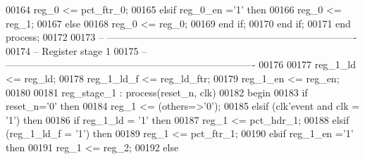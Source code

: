 \begin{DoxyCode}
00164                 reg\_0 <= pct\_ftr\_0;
00165          \textcolor{keywordflow}{elsif} \textcolor{vhdlchar}{reg_0_en} \textcolor{vhdlchar}{=}\textcolor{vhdlchar}{'}\textcolor{vhdllogic}{}\textcolor{vhdllogic}{1}\textcolor{vhdlchar}{'} \textcolor{keywordflow}{then} 
00166             reg\_0 <= reg\_1;
00167          \textcolor{keywordflow}{else} 
00168             reg\_0 <= reg\_0;
00169          \textcolor{keywordflow}{end} \textcolor{keywordflow}{if};
00170       \textcolor{keywordflow}{end} \textcolor{keywordflow}{if};
00171    \textcolor{keywordflow}{end} \textcolor{keywordflow}{process};
00172    
00173 \textcolor{keyword}{-- ----------------------------------------------------------------------------}
00174 \textcolor{keyword}{-- Register stage 1}
00175 \textcolor{keyword}{-- ----------------------------------------------------------------------------  }
00176    
00177 reg\_1\_ld <= reg\_ld;
00178 reg\_1\_ld\_f <= reg\_ld\_ftr;
00179 reg\_1\_en <= reg\_en;
00180    
00181  reg\_stage\_1 :  \textcolor{keywordflow}{process}(reset_n, clk)
00182 \textcolor{vhdlkeyword}{   begin}
00183       \textcolor{keywordflow}{if} \textcolor{vhdlchar}{reset_n}\textcolor{vhdlchar}{=}\textcolor{vhdlchar}{'}\textcolor{vhdllogic}{}\textcolor{vhdllogic}{0}\textcolor{vhdlchar}{'} \textcolor{keywordflow}{then}
00184          reg\_1 <= (others=>'0');
00185       \textcolor{keywordflow}{elsif} \textcolor{vhdlchar}{(}\textcolor{vhdlchar}{clk}\textcolor{vhdlchar}{'}\textcolor{vhdlkeyword}{event} \textcolor{keywordflow}{and} \textcolor{vhdlchar}{clk} \textcolor{vhdlchar}{=} \textcolor{vhdlchar}{'}\textcolor{vhdllogic}{}\textcolor{vhdllogic}{1}\textcolor{vhdlchar}{'}\textcolor{vhdlchar}{)} \textcolor{keywordflow}{then}
00186          \textcolor{keywordflow}{if} \textcolor{vhdlchar}{reg_1_ld} \textcolor{vhdlchar}{=} \textcolor{vhdlchar}{'}\textcolor{vhdllogic}{}\textcolor{vhdllogic}{1}\textcolor{vhdlchar}{'} \textcolor{keywordflow}{then} 
00187             reg\_1 <= pct\_hdr\_1;
00188             \textcolor{keywordflow}{elsif} \textcolor{vhdlchar}{(}\textcolor{vhdlchar}{reg_1_ld_f} \textcolor{vhdlchar}{=} \textcolor{vhdlchar}{'}\textcolor{vhdllogic}{}\textcolor{vhdllogic}{1}\textcolor{vhdlchar}{'}\textcolor{vhdlchar}{)} \textcolor{keywordflow}{then}
00189                 reg\_1 <= pct\_ftr\_1;
00190          \textcolor{keywordflow}{elsif} \textcolor{vhdlchar}{reg_1_en} \textcolor{vhdlchar}{=}\textcolor{vhdlchar}{'}\textcolor{vhdllogic}{}\textcolor{vhdllogic}{1}\textcolor{vhdlchar}{'} \textcolor{keywordflow}{then} 
00191             reg\_1 <= reg\_2;
00192          \textcolor{keywordflow}{else} 

\end{DoxyCode}
